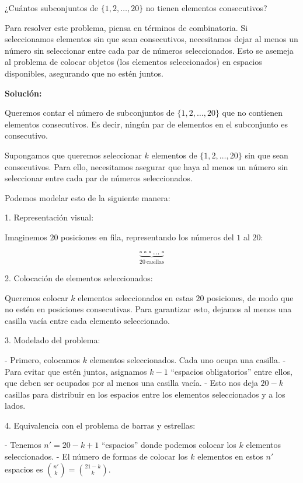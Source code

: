 \documentclass[11pt]{scrartcl}
\begin{document}
\begin{problem}
¿Cuántos subconjuntos de $\{1, 2, \dots, 20\}$ no tienen elementos consecutivos?

\begin{hint}
Para resolver este problema, piensa en términos de combinatoria. Si seleccionamos elementos sin que sean consecutivos, necesitamos dejar al menos un número sin seleccionar entre cada par de números seleccionados. Esto se asemeja al problema de colocar objetos (los elementos seleccionados) en espacios disponibles, asegurando que no estén juntos.

\begin{solu}
\textbf{Solución:}

Queremos contar el número de subconjuntos de $\{1, 2, \dots, 20\}$ que no contienen elementos consecutivos. Es decir, ningún par de elementos en el subconjunto es consecutivo.

Supongamos que queremos seleccionar $k$ elementos de $\{1, 2, \dots, 20\}$ sin que sean consecutivos. Para ello, necesitamos asegurar que haya al menos un número sin seleccionar entre cada par de números seleccionados.

Podemos modelar esto de la siguiente manera:

1. Representación visual:

   Imaginemos $20$ posiciones en fila, representando los números del $1$ al $20$:

   $$
   \underbrace{\square\ \square\ \square\ \dots\ \square}_{20\ \text{casillas}}
   $$

2. Colocación de elementos seleccionados:

   Queremos colocar $k$ elementos seleccionados en estas $20$ posiciones, de modo que no estén en posiciones consecutivas. Para garantizar esto, dejamos al menos una casilla vacía entre cada elemento seleccionado.

3. Modelado del problema:

   - Primero, colocamos $k$ elementos seleccionados. Cada uno ocupa una casilla.
   - Para evitar que estén juntos, asignamos $k - 1$ ``espacios obligatorios'' entre ellos, que deben ser ocupados por al menos una casilla vacía.
   - Esto nos deja $20 - k$ casillas para distribuir en los espacios entre los elementos seleccionados y a los lados.

4. Equivalencia con el problema de barras y estrellas:

   - Tenemos $n' = 20 - k + 1$ ``espacios'' donde podemos colocar los $k$ elementos seleccionados.
   - El número de formas de colocar los $k$ elementos en estos $n'$ espacios es $\binom{n'}{k} = \binom{21 - k}{k}$.


\end{solu}
\end{hint}
\end{problem}
\end{document}
